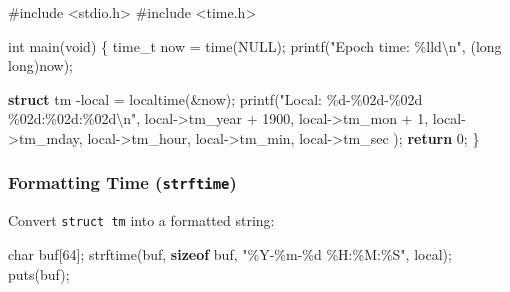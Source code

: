 \documentclass[
  letterpaper,
  DIV=11,
  numbers=noendperiod]{scrreprt}
\newenvironment{Shaded}{\begin{snugshade}}{\end{snugshade}}
\newcommand{\ControlFlowTok}[1]{\textcolor[rgb]{0.00,0.23,0.31}{\textbf{#1}}}
\newcommand{\DataTypeTok}[1]{\textcolor[rgb]{0.68,0.00,0.00}{#1}}
\newcommand{\DecValTok}[1]{\textcolor[rgb]{0.68,0.00,0.00}{#1}}
\newcommand{\ImportTok}[1]{\textcolor[rgb]{0.00,0.46,0.62}{#1}}
\newcommand{\KeywordTok}[1]{\textcolor[rgb]{0.00,0.23,0.31}{\textbf{#1}}}
\newcommand{\NormalTok}[1]{\textcolor[rgb]{0.00,0.23,0.31}{#1}}
\newcommand{\OperatorTok}[1]{\textcolor[rgb]{0.37,0.37,0.37}{#1}}
\newcommand{\PreprocessorTok}[1]{\textcolor[rgb]{0.68,0.00,0.00}{#1}}
\newcommand{\SpecialCharTok}[1]{\textcolor[rgb]{0.37,0.37,0.37}{#1}}
\newcommand{\StringTok}[1]{\textcolor[rgb]{0.13,0.47,0.30}{#1}}
\begin{document}
\begin{Shaded}
\begin{Highlighting}[]
\PreprocessorTok{\#include }\ImportTok{\textless{}stdio.h\textgreater{}}
\PreprocessorTok{\#include }\ImportTok{\textless{}time.h\textgreater{}}

\DataTypeTok{int}\NormalTok{ main}\OperatorTok{(}\DataTypeTok{void}\OperatorTok{)} \OperatorTok{\{}
    \DataTypeTok{time\_t}\NormalTok{ now }\OperatorTok{=}\NormalTok{ time}\OperatorTok{(}\NormalTok{NULL}\OperatorTok{);}
\NormalTok{    printf}\OperatorTok{(}\StringTok{"Epoch time: }\SpecialCharTok{\%lld\textbackslash{}n}\StringTok{"}\OperatorTok{,} \OperatorTok{(}\DataTypeTok{long} \DataTypeTok{long}\OperatorTok{)}\NormalTok{now}\OperatorTok{);}

    \KeywordTok{struct}\NormalTok{ tm }\OperatorTok{{-}}\NormalTok{local }\OperatorTok{=}\NormalTok{ localtime}\OperatorTok{(\&}\NormalTok{now}\OperatorTok{);}
\NormalTok{    printf}\OperatorTok{(}\StringTok{"Local: }\SpecialCharTok{\%d}\StringTok{{-}}\SpecialCharTok{\%02d}\StringTok{{-}}\SpecialCharTok{\%02d}\StringTok{ }\SpecialCharTok{\%02d}\StringTok{:}\SpecialCharTok{\%02d}\StringTok{:}\SpecialCharTok{\%02d\textbackslash{}n}\StringTok{"}\OperatorTok{,}
\NormalTok{        local}\OperatorTok{{-}\textgreater{}}\NormalTok{tm\_year }\OperatorTok{+} \DecValTok{1900}\OperatorTok{,}
\NormalTok{        local}\OperatorTok{{-}\textgreater{}}\NormalTok{tm\_mon }\OperatorTok{+} \DecValTok{1}\OperatorTok{,}
\NormalTok{        local}\OperatorTok{{-}\textgreater{}}\NormalTok{tm\_mday}\OperatorTok{,}
\NormalTok{        local}\OperatorTok{{-}\textgreater{}}\NormalTok{tm\_hour}\OperatorTok{,}
\NormalTok{        local}\OperatorTok{{-}\textgreater{}}\NormalTok{tm\_min}\OperatorTok{,}
\NormalTok{        local}\OperatorTok{{-}\textgreater{}}\NormalTok{tm\_sec}
    \OperatorTok{);}
    \ControlFlowTok{return} \DecValTok{0}\OperatorTok{;}
\OperatorTok{\}}
\end{Highlighting}
\end{Shaded}

\subsubsection{\texorpdfstring{Formatting Time
(\texttt{strftime})}{Formatting Time (strftime)}}\label{formatting-time-strftime}

Convert \texttt{struct\ tm} into a formatted string:

\begin{Shaded}
\begin{Highlighting}[]
\DataTypeTok{char}\NormalTok{ buf}\OperatorTok{[}\DecValTok{64}\OperatorTok{];}
\NormalTok{strftime}\OperatorTok{(}\NormalTok{buf}\OperatorTok{,} \KeywordTok{sizeof}\NormalTok{ buf}\OperatorTok{,} \StringTok{"\%Y{-}\%m{-}}\SpecialCharTok{\%d}\StringTok{ \%H:\%M:\%S"}\OperatorTok{,}\NormalTok{ local}\OperatorTok{);}
\NormalTok{puts}\OperatorTok{(}\NormalTok{buf}\OperatorTok{);}
\end{Highlighting}
\end{Shaded}
\end{document}
